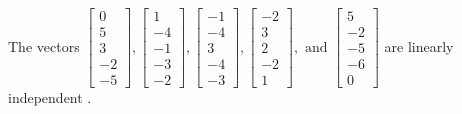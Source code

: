 \begin{exercise}
\begin{exerciseStatement}
  \end{exerciseStatement}
  \begin{exerciseAnswer}
   The vectors \(\left[\begin{array}{r}
0 \\
5 \\
3 \\
-2 \\
-5
\end{array}\right] , \left[\begin{array}{r}
1 \\
-4 \\
-1 \\
-3 \\
-2
\end{array}\right] , \left[\begin{array}{r}
-1 \\
-4 \\
3 \\
-4 \\
-3
\end{array}\right] , \left[\begin{array}{r}
-2 \\
3 \\
2 \\
-2 \\
1
\end{array}\right] , \text{ and } \left[\begin{array}{r}
5 \\
-2 \\
-5 \\
-6 \\
0
\end{array}\right]\) are 
  	 linearly independent  .
  


  \end{exerciseAnswer}
\end{exercise}